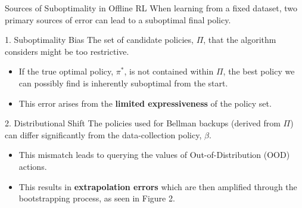 \documentclass[11pt]{beamer}
\newcommand{\tb}[1]{\textbf{#1}}
\begin{document}
\begin{frame}{Sources of Suboptimality in Offline RL}
    When learning from a fixed dataset, two primary sources of error can lead to a suboptimal final policy.

    \begin{block}{1. Suboptimality Bias}
        The set of candidate policies, $\Pi$, that the algorithm considers might be too restrictive.
        \begin{itemize}
            \item If the true optimal policy, $\pi^*$, is not contained within $\Pi$, the best policy we can possibly find is inherently suboptimal from the start.
            \item This error arises from the \tb{limited expressiveness} of the policy set.
        \end{itemize}
    \end{block}

    \begin{block}{2. Distributional Shift}
        The policies used for Bellman backups (derived from $\Pi$) can differ significantly from the data-collection policy, $\beta$.
        \begin{itemize}
            \item This mismatch leads to querying the values of Out-of-Distribution (OOD) actions.
            \item This results in \tb{extrapolation errors} which are then amplified through the bootstrapping process, as seen in Figure 2.
        \end{itemize}
    \end{block}
\end{frame}
\end{document}
